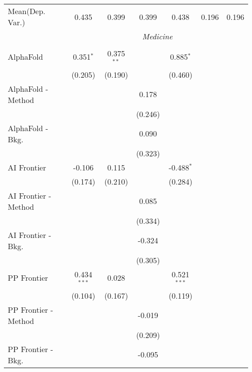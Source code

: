 \begin{tabular}{lcccccc}
Mean(Dep. Var.) & 0.435 & 0.399 & 0.399 & 0.438 & 0.196 & 0.196 \\
 & \multicolumn{6}{c}{\textit{Medicine}} \\ \\
   AlphaFold            & 0.351$^{*}$   & 0.375$^{**}$ &         & 0.885$^{*}$   &        &   \\   
                        & (0.205)       & (0.190)      &         & (0.460)       &        &   \\   
   AlphaFold - Method   &               &              & 0.178   &               &        &   \\   
                        &               &              & (0.246) &               &        &   \\   
   AlphaFold - Bkg.     &               &              & 0.090   &               &        &   \\   
                        &               &              & (0.323) &               &        &   \\   
   AI Frontier          & -0.106        & 0.115        &         & -0.488$^{*}$  &        &   \\   
                        & (0.174)       & (0.210)      &         & (0.284)       &        &   \\   
   AI Frontier - Method &               &              & 0.085   &               &        &   \\   
                        &               &              & (0.334) &               &        &   \\   
   AI Frontier - Bkg.   &               &              & -0.324  &               &        &   \\   
                        &               &              & (0.305) &               &        &   \\   
   PP Frontier          & 0.434$^{***}$ & 0.028        &         & 0.521$^{***}$ &        &   \\   
                        & (0.104)       & (0.167)      &         & (0.119)       &        &   \\   
   PP Frontier - Method &               &              & -0.019  &               &        &   \\   
                        &               &              & (0.209) &               &        &   \\   
   PP Frontier - Bkg.   &               &              & -0.095  &               &        &   \\   

\end{tabular}
